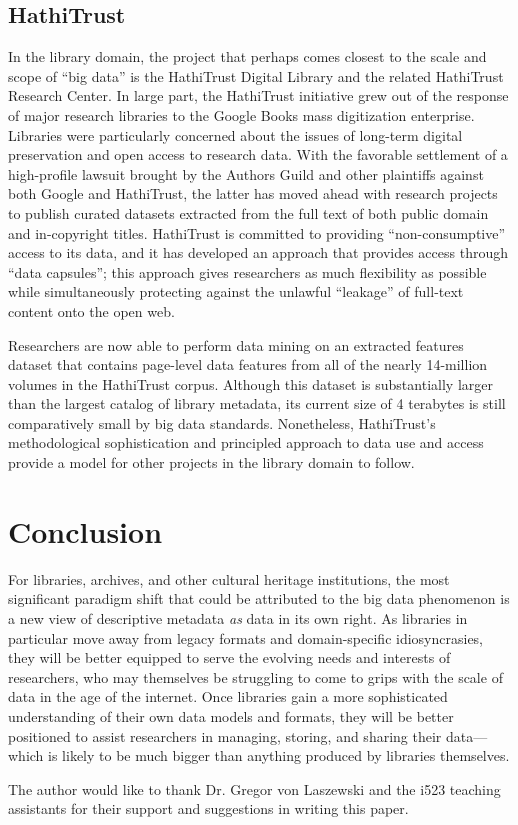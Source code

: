 \documentclass[sigconf]{acmart}
\begin{document}
\subsection{HathiTrust}
In the library domain, the project that perhaps comes closest to the scale and scope of ``big data'' is the HathiTrust Digital Library and the related HathiTrust Research Center. In large part, the HathiTrust initiative grew out of the response of major research libraries to the Google Books mass digitization enterprise\cite{hC10, bP13, jZ14}. Libraries were particularly concerned about the issues of long-term digital preservation and open access to research data. With the favorable settlement of a high-profile lawsuit brought by the Authors Guild and other plaintiffs against both Google and HathiTrust, the latter has moved ahead with research projects to publish curated datasets extracted from the full text of both public domain and in-copyright titles. HathiTrust is committed to providing ``non-consumptive'' access to its data, and it has developed an approach that provides access through ``data capsules''; this approach gives researchers as much flexibility as possible while simultaneously protecting against the unlawful ``leakage'' of full-text content onto the open web\cite{jZ14}.

Researchers are now able to perform data mining on an extracted features dataset that contains page-level data features from all of the nearly 14-million volumes in the HathiTrust corpus. Although this dataset is substantially larger than the largest catalog of library metadata, its current size of 4 terabytes is still comparatively small by big data standards\cite{hT17}. Nonetheless, HathiTrust's methodological sophistication and principled approach to data use and access provide a model for other projects in the library domain to follow.

\section{Conclusion}
For libraries, archives, and other cultural heritage institutions, the most significant paradigm shift that could be attributed to the big data phenomenon is a new view of descriptive metadata \textit{as} data in its own right. As libraries in particular move away from legacy formats and domain-specific idiosyncrasies, they will be better equipped to serve the evolving needs and interests of researchers, who may themselves be struggling to come to grips with the scale of data in the age of the internet. Once libraries gain a more sophisticated understanding of their own data models and formats, they will be better positioned to assist researchers in managing, storing, and sharing their data---which is likely to be much bigger than anything produced by libraries themselves.

\begin{acks}
The author would like to thank Dr. Gregor von Laszewski and the i523 teaching assistants for their support and suggestions in writing this paper.
\end{acks}


 
\end{document}
